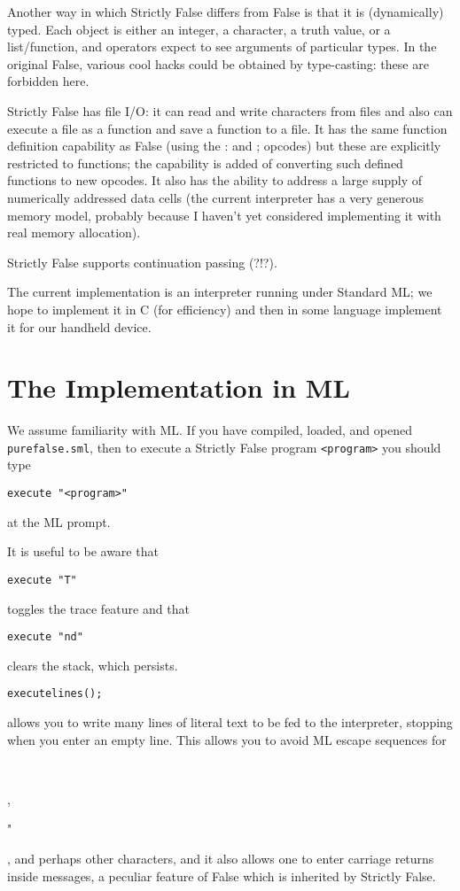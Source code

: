 \documentclass[12pt]{article}
\begin{document}
Another way in which Strictly False differs from False is that it is
(dynamically) typed.  Each object is either an integer, a character, a
truth value, or a list/function, and operators expect to see arguments
of particular types.  In the original False, various cool hacks could be
obtained by type-casting:  these are forbidden here.

Strictly False has file I/O: it can read and write characters from
files and also can execute a file as a function and save a function to
a file.  It has the same function definition capability as False
(using the : and ; opcodes) but these are explicitly restricted to
functions; the capability is added of converting such defined
functions to new opcodes.  It also has the ability to address a large
supply of numerically addressed data cells (the current interpreter
has a very generous memory model, probably because I haven't yet
considered implementing it with real memory allocation).

Strictly False supports continuation passing (?!?).

The current implementation is an interpreter running under Standard ML;
we hope to implement it in C (for efficiency) and then in some language
implement it for our handheld device.

\section{The Implementation in ML}

We assume familiarity with ML.  If you have compiled, loaded, and opened
{\tt purefalse.sml}, then to execute a Strictly False program {\tt <program>}
you should type

{\tt execute "<program>"}

at the ML prompt.

It is useful to be aware that

{\tt execute "T"}

toggles the trace feature and that

{\tt execute "nd"}

clears the stack, which persists.

{\tt executelines();}

allows you to write many lines of literal text to be fed to the
interpreter, stopping when you enter an empty line.  This allows you
to avoid ML escape sequences for \begin{verb} \ \end{verb}, 
\begin{verb} " \end{verb}, and perhaps other characters, and it also allows one to enter
carriage returns inside messages, a peculiar feature of False which is
inherited by Strictly False.
\end{document}
